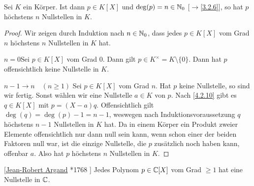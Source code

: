 \documentclass[../../main.tex]{subfiles}
\begin{document}
\begin{kor}\label{4.2.11}
Sei $K$ ein Körper. Ist dann $p\in K[X]$ und $\deg(p)=n\in\mathbb N_0$ {\rm[$\to$\ref{3.2.6}]}, so hat $p$ höchstens $n$ Nullstellen in $K$.
\end{kor}
\begin{proof}
Wir zeigen durch Induktion nach $n\in\mathbb N_0$, dass jedes $p\in K[X]$ vom Grad $n$ höchstens $n$ Nullstellen in $K$ hat.

\underline{$n=0$}\quad Sei $p\in K[X]$ vom Grad $0$. Dann gilt $p\in K^\times=K\setminus\{0\}$. Dann hat $p$ offensichtlich keine Nullstelle in $K$.

\underline{$n-1\to n\quad(n\ge1)$} Sei $p\in K[X]$ vom Grad $n$. Hat $p$ keine Nullstelle, so sind wir fertig. Sonst wählen wir eine Nullstelle $a\in K$ von $p$. Nach
\ref{4.2.10} gibt es $q\in K[X]$ mit $p=(X-a)q$. Offensichtlich gilt $\deg(q)=\deg(p)-1=n-1$, weswegen nach Induktionsvoraussetzung $q$ höchstens $n-1$ Nullstellen
in $K$ hat. Da in einem Körper ein Produkt zweier Elemente offensichtlich nur dann null sein kann, wenn schon einer der beiden Faktoren null war, ist die einzige Nullstelle,
die $p$ zusätzlich noch haben kann, offenbar $a$. Also hat $p$ höchstens $n$ Nullstellen in $K$.
\end{proof}

\begin{sat}{\rm[\href{http://de.wikipedia.org/wiki/Jean-Robert_Argand}{Jean-Robert Argand} *1768 ]}\label{4.2.12}
Jedes Polynom $p\in\mathbb C[X]$ vom Grad $\ge1$ hat eine Nullstelle in $\mathbb C$.
\end{sat}
\end{document}

